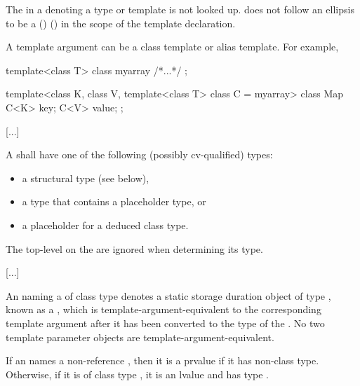 \documentclass{wg21}
\begin{document}
\pnum
The  in a 
{ denoting a type or template} is not looked up.
   does not follow an ellipsis
to be a
()\added{,}
()
in the scope of the template declaration.

\begin{note}
A template argument 
can be a class template or alias template.
For example,

\begin{codeblock}
    template<class T> class myarray { /*...*/ };

    template<class K, class V, template<class T> class C = myarray>
    class Map {
        C<K> key;
        C<V> value;
    };
\end{codeblock}
\end{note}

\textcolor{noteclr}{[...]}

\pnum
A 
shall have one of the following (possibly cv-qualified) types:
\begin{itemize}
    \item a structural type (see below),
    \item a type that contains a placeholder type, or
    \item a placeholder for a deduced class type.
\end{itemize}
The top-level
on the
are ignored when determining its type.

\textcolor{noteclr}{[...]}

\pnum
An  naming
a 
of class type 
denotes a static storage duration object of type ,
known as a ,
which is template-argument-equivalent to
the corresponding template argument
after it has been converted
to the type of the  .
No two template parameter objects are template-argument-equivalent.
\begin{note}
    If an  names
    a  non-reference  ,
    then it is a prvalue if it has non-class type.
    Otherwise, if it is of class type ,
    it is an lvalue and has type  .
\end{note}
\end{document}

